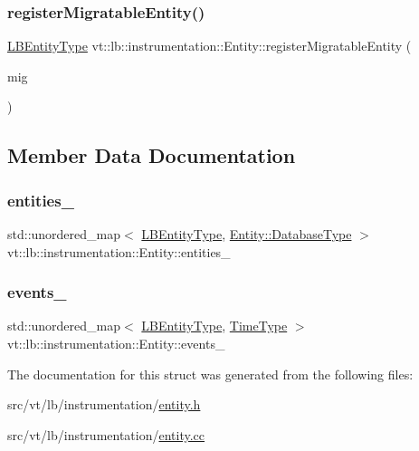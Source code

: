 \subsubsection{\texorpdfstring{register\+Migratable\+Entity()}{registerMigratableEntity()}}
{\footnotesize\ttfamily \hyperlink{namespacevt_a92ec26fb6644cd0ba7eb0ee70c96bee5}{L\+B\+Entity\+Type} vt\+::lb\+::instrumentation\+::\+Entity\+::register\+Migratable\+Entity (\begin{DoxyParamCaption}\item[{\hyperlink{structvt_1_1lb_1_1instrumentation_1_1_entity_a40dd6e30c20027d66b9193323d9e0cb0}{Migratable\+Type} $\ast$}]{mig }\end{DoxyParamCaption})\hspace{0.3cm}{\ttfamily [static]}}



\subsection{Member Data Documentation}
\mbox{\label{structvt_1_1lb_1_1instrumentation_1_1_entity_adb7aa52c4f07c79b2f092ff21c4c184d}} 
\subsubsection{\texorpdfstring{entities\+\_\+}{entities\_}}
{\footnotesize\ttfamily std\+::unordered\+\_\+map$<$ \hyperlink{namespacevt_a92ec26fb6644cd0ba7eb0ee70c96bee5}{L\+B\+Entity\+Type}, \hyperlink{structvt_1_1lb_1_1instrumentation_1_1_entity_a2c8b6bfe6f30a4407a996aaae856b052}{Entity\+::\+Database\+Type} $>$ vt\+::lb\+::instrumentation\+::\+Entity\+::entities\+\_\+\hspace{0.3cm}{\ttfamily [static]}}

\mbox{\label{structvt_1_1lb_1_1instrumentation_1_1_entity_a081fe87532fd7b2a50e90024b11c3fa4}} 
\subsubsection{\texorpdfstring{events\+\_\+}{events\_}}
{\footnotesize\ttfamily std\+::unordered\+\_\+map$<$ \hyperlink{namespacevt_a92ec26fb6644cd0ba7eb0ee70c96bee5}{L\+B\+Entity\+Type}, \hyperlink{namespacevt_a876a9d0cd5a952859c72de8a46881442}{Time\+Type} $>$ vt\+::lb\+::instrumentation\+::\+Entity\+::events\+\_\+\hspace{0.3cm}{\ttfamily [static]}}



The documentation for this struct was generated from the following files\+:\begin{DoxyCompactItemize}
\item 
src/vt/lb/instrumentation/\hyperlink{lb_2instrumentation_2entity_8h}{entity.\+h}\item 
src/vt/lb/instrumentation/\hyperlink{entity_8cc}{entity.\+cc}\end{DoxyCompactItemize}
